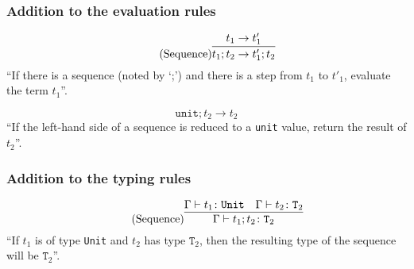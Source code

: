 \subsubsection{Addition to the evaluation rules \cite{pierce2002ProgLang}}
\begin{equation*}
    \tag{Sequence}
    \infer{
        t_1 ; t_2 \rightarrow t'_1 ; t_2
    }{
        t_1 \rightarrow t'_1
    }
\end{equation*}
``If there is a sequence (noted by `;') and there is a step from $t_1$ to
$t'_1$, evaluate the term $t_1$''.

\begin{equation*}
    \tag{Sequence Next}
    \texttt{unit} ; t_2 \rightarrow t_2
\end{equation*}
``If the left-hand side of a sequence is reduced to a \texttt{unit} value,
return the result of $t_2$''.

\subsubsection{Addition to the typing rules \cite{pierce2002ProgLang}}
\begin{equation*}
    \tag{Sequence}
    \infer{
        \Gamma \vdash t_1 ; t_2 \colon \texttt{T}_2
    }{
        \Gamma \vdash t_1 \colon \texttt{Unit} & \Gamma \vdash t_2 \colon \texttt{T}_2
    }
\end{equation*}
``If $t_1$ is of type \texttt{Unit} and $t_2$ has type $\texttt{T}_2$, then
the resulting type of the sequence will be $\texttt{T}_2$''.
